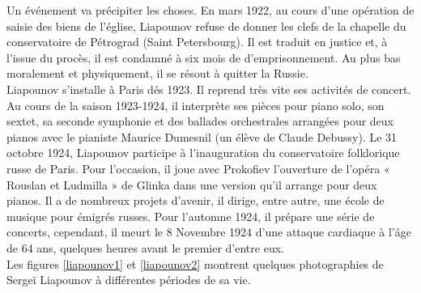 Un événement va précipiter les choses. En mars 1922, au cours d'une opération de saisie des biens de l'église, Liapounov refuse de donner les clefs de la chapelle du conservatoire de Pétrograd (Saint Petersbourg). Il est traduit en justice et, à l'issue du procès, il est condamné à six mois de d'emprisonnement. Au plus bas moralement et physiquement, il se résout à quitter la Russie.\\

Liapounov s'installe à Paris dés 1923. Il reprend très vite ses activités de concert. Au cours de la saison 1923-1924, il interprète ses pièces pour piano solo, son sextet, sa seconde symphonie et des ballades orchestrales arrangées pour deux pianos avec le pianiste Maurice Dumesnil (un élève de Claude Debussy). Le 31 octobre 1924, Liapounov participe à l'inauguration du conservatoire folklorique russe de Paris. Pour l'occasion, il joue avec Prokofiev l'ouverture de l'opéra « Rouslan et Ludmilla » de Glinka dans une version qu'il arrange pour deux pianos. Il a de nombreux projets d'avenir, il dirige, entre autre, une école de musique pour émigrés russes. Pour l'automne 1924, il prépare une série de concerts, cependant, il meurt le 8 Novembre 1924 d'une attaque cardiaque à l'âge de 64 ans, quelques heures avant le premier d'entre eux.\\

Les figures \ref{liapounov1} et \ref{liapounov2} montrent quelques photographies de Sergeï Liapounov à différentes périodes de sa vie.

